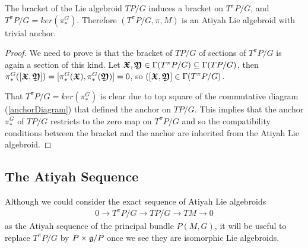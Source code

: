 \begin{theorem}
The bracket of the Lie algebroid $TP/G$ induces a bracket on $T^\pi P/G$, and $T^\pi P/G = ker(\pi_*^G)$. Therefore $(T^\pi P/G, \pi, M)$ is an Atiyah Lie algebroid with trivial anchor.
\end{theorem}

\begin{proof}
We need to prove is that the bracket of $TP/G$ of sections of $T^\pi P/G$ is again a section of this kind. Let $\bm{\mathfrak{X}}, \bm{\mathfrak{Y}} \in \Gamma(T^\pi P/G) \subseteq \Gamma(TP/G)$, then $\pi_*^G([\bm{\mathfrak{X}}, \bm{\mathfrak{Y}}]) = [\pi_*^G (\bm{\mathfrak{X}}), \pi_*^G(\bm{\mathfrak{Y}})] = 0$, so $([\bm{\mathfrak{X}}, \bm{\mathfrak{Y}}] \in \Gamma(T^\pi P/G)$. 

That $T^\pi P/G = ker(\pi_*^G)$ is clear due to top square of the commutative diagram (\ref{anchorDiagram}) that defined the anchor on $TP/G$. This implies that the anchor $\pi_*^G$ of $TP/G$ restricts to the zero map on $T^\pi P/G$ and so the compatibility conditions between the bracket and the anchor are inherited from the Atiyah Lie algebroid.
\end{proof}

\subsection{The Atiyah Sequence}%

Although we could consider the exact sequence of Atiyah Lie algebroids
\begin{align*}
    0 \to T^\pi P/G \to TP/G \to TM \to 0
\end{align*}
as the Atiyah sequence of the principal bundle $P(M, G)$, it will be useful to replace $T^\pi P/G$ by $P \times \mathfrak{g}/P$ once we see they are isomorphic Lie algebroids.


